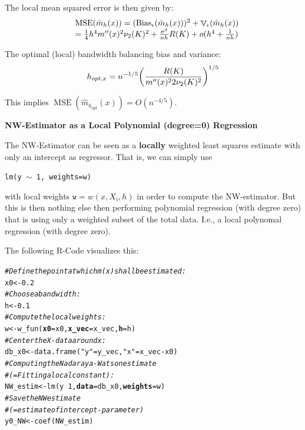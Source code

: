 \documentclass[14pt]{extreport}\usepackage[]{graphicx}\usepackage[]{xcolor}
\makeatletter
\newcommand{\hlnum}[1]{\textcolor[rgb]{0.69,0.494,0}{#1}}%
\newcommand{\hlstr}[1]{\textcolor[rgb]{0.749,0.012,0.012}{#1}}%
\newcommand{\hlcom}[1]{\textcolor[rgb]{0.514,0.506,0.514}{\textit{#1}}}%
\newcommand{\hlopt}[1]{\textcolor[rgb]{0,0,0}{#1}}%
\newcommand{\hlstd}[1]{\textcolor[rgb]{0,0,0}{#1}}%
\newcommand{\hlkwb}[1]{\textcolor[rgb]{0,0.341,0.682}{#1}}%
\newcommand{\hlkwc}[1]{\textcolor[rgb]{0,0,0}{\textbf{#1}}}%
\newcommand{\hlkwd}[1]{\textcolor[rgb]{0.004,0.004,0.506}{#1}}%
\newenvironment{kframe}{%
 \def\at@end@of@kframe{}%
 \ifinner\ifhmode%
  \def\at@end@of@kframe{\end{minipage}}%
  \begin{minipage}{\columnwidth}%
 \fi\fi%
 \def\FrameCommand##1{\hskip\@totalleftmargin \hskip-\fboxsep
 \colorbox{shadecolor}{##1}\hskip-\fboxsep
     \hskip-\linewidth \hskip-\@totalleftmargin \hskip\columnwidth}%
 \MakeFramed {\advance\hsize-\width
   \@totalleftmargin\z@ \linewidth\hsize
   \@setminipage}}%
 {\par\unskip\endMakeFramed%
 \at@end@of@kframe}
\newenvironment{knitrout}{}{} %
\DeclareMathOperator{\V}{\mathbb{V}}
\makeatother
\begin{document}
\bigskip
The local mean squared error is then given by:
$$\begin{array}{ll}
&\operatorname{MSE}(\hat m_h(x))
= (\operatorname{Bias}_\epsilon({\hat m}_ h(x)))^2
+ \V_\epsilon({\hat m}_ h(x))\\
&= {1\over 4}  h^4  m''(x)^2\nu_2(K)^2 +{\sigma^2\over n
h}  R(K)+o(h^4+\frac{1}{nh})
\end{array}$$


The optimal (local) bandwidth balancing bias and variance:
$$ h_{opt,x}=n^{-1/5}\biggl({R(K) \over
m''(x)^22\nu_2(K)^2}\biggr)^{1/5}$$

This implies $\operatorname{MSE}(\hat m_{h_{opt}}(x))=O(n^{-4/5})$.


\newpage

\textbf{NW-Estimator as a Local Polynomial (degree=0) Regression}
\bigskip

The NW-Estimator can be seen as a \textbf{locally} weighted least squares estimate with only an intercept as regressor. That is, we can simply use 
\begin{center}
\texttt{lm(y $\sim$ 1, weights=w)}
\end{center}
with local weights $\texttt{w}=w(x,X_i,h)$ in order to compute the NW-estimator. But this is then nothing else then performing polynomial regression (with degree zero) that is using only a weighted subset of the total data. I.e., a local polynomal regression (with degree zero).

\bigskip

The following R-Code visualizes this:
\begin{knitrout}
\color{fgcolor}\begin{kframe}
\begin{alltt}
\hlcom{# Define the point at which m(x) shall be estimated:}
\hlstd{x0}       \hlkwb{<-} \hlnum{0.2}
\hlcom{# Choose a bandwidth:}
\hlstd{h}        \hlkwb{<-} \hlnum{0.1}
\hlcom{# Compute the local weights:}
\hlstd{w}        \hlkwb{<-} \hlkwd{w_fun}\hlstd{(}\hlkwc{x0} \hlstd{= x0,} \hlkwc{x_vec} \hlstd{= x_vec,} \hlkwc{h} \hlstd{= h)}
\hlcom{# Center the X-data around x:}
\hlstd{db_x0}    \hlkwb{<-} \hlkwd{data.frame}\hlstd{(}\hlstr{"y"}\hlstd{=y_vec,} \hlstr{"x"}\hlstd{=x_vec}\hlopt{-}\hlstd{x0)}
\hlcom{# Computing the Nadaraya-Watson estimate }
\hlcom{# (= Fitting a local constant):}
\hlstd{NW_estim} \hlkwb{<-} \hlkwd{lm}\hlstd{(y} \hlopt{~} \hlnum{1}\hlstd{,} \hlkwc{data}\hlstd{=db_x0,} \hlkwc{weights}\hlstd{=w)}
\hlcom{# Save the NW estimate }
\hlcom{# (=estimate of intercept-parameter)}
\hlstd{y0_NW}    \hlkwb{<-} \hlkwd{coef}\hlstd{(NW_estim)}
\end{alltt}
\end{kframe}
\end{knitrout}
 
\end{document}

